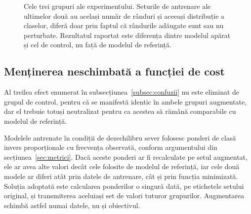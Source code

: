 \begin{figure}[!h]
    \centering
    \caption{Cele trei grupuri ale experimentului. Seturile de antrenare ale ultimelor două au același număr de rânduri și aceeași distribuție a claselor, diferă doar prin faptul că rândurile adăugate sunt sau nu perturbate. Rezultatul raportat este diferența dintre modelul apărat și cel de control, nu față de modelul de referință.}
    \label{fig:brate}
\end{figure}

\subsection{Menținerea neschimbată a funcției de cost}\label{subsec:ponderi}

Al treilea efect enumerat în subsecțiunea~\ref{subsec:confuzii} nu este eliminat de grupul de control, pentru că se manifestă identic în ambele grupuri augmentate, dar el trebuie totuși neutralizat pentru ca acestea să rămână comparabile cu modelul de referință.

Modelele antrenate în condiții de dezechilibru sever folosesc ponderi de clasă invers proporționale cu frecvența observată, conform argumentului din secțiunea~\ref{sec:metrici}. Dacă aceste ponderi ar fi recalculate pe setul augmentat, ele ar avea alte valori decât cele folosite de modelul de referință, iar cele două modele ar diferi atât prin datele de antrenare, cât și prin funcția minimizată. Soluția adoptată este calcularea ponderilor o singură dată, pe etichetele setului original, și transmiterea aceluiași set de valori tuturor grupurilor. Augmentarea schimbă astfel numai datele, nu și obiectivul.


